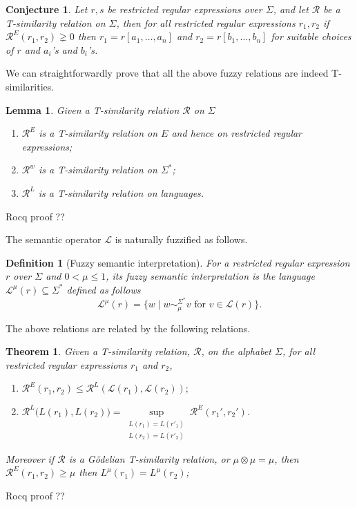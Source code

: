 \documentclass{article}
\newcommand{\cR}{{\mathcal R}}
\def\cut{\mu}
\newtheorem{definition}{Definition}[section]
\newtheorem{lemma}{Lemma}[section]
\newtheorem{theorem}{Theorem}[section]
\newtheorem{conjecture}{Conjecture}[section]
\begin{document}
{\color{red}\begin{conjecture} Let $r,s$ be restricted regular expressions over $\Sigma$, and let $\mathcal{R}$ be a T-similarity relation on $\Sigma$, then for all restricted regular expressions $r_1,r_2$ if $\mathcal{R}^E(r_1,r_2)\gneq 0$ then $r_1=r[a_1,\ldots,a_n] $ and $r_2=r[b_1,\ldots,b_n] $ for suitable choices of $r$ and $a_i$'s and $b_i$'s. 
\end{conjecture}}

We can straightforwardly prove that all the above fuzzy relations are indeed T-similarities.
\begin{lemma} \label{T-similarity}Given a T-similarity relation $\mathcal R$ on $\Sigma$ \begin{enumerate}
\item $\mathcal{R}^{E}$ is a T-similarity relation on $E$ and hence on restricted regular expressions;
\item $\mathcal{R}^w$ is a T-similarity relation on $\Sigma^*$;
\item$\mathcal R^L$ is a T-similarity relation on languages.
\end{enumerate}
\end{lemma}
{\color{red} Rocq proof ??}\vspace{0.5cm}

\noindent The semantic operator $\mathcal L$ is naturally fuzzified as follows.
\begin{definition}[Fuzzy semantic interpretation] For a restricted regular expression $r$ over $\Sigma$ and
$0 < \cut \le 1$, its {\em fuzzy semantic interpretation} is the language $\mathcal L^\mu(r)\subseteq \Sigma^{\ast}$ defined as follows 
\[\mathcal L^\mu (r)=\{w\mid w\sim_\mu^{\Sigma^*}v\mbox{ for } v\in \mathcal L(r)\}.\]
\end{definition}

\noindent The above relations are related by the following relations.
\begin{theorem}\label{thm:Rr-RL-bridge} Given a T-similarity relation, $\cR$, on the alphabet $\Sigma$, for all restricted regular expressions $r_1$ and $r_2$,
\begin{enumerate} 
\item$\mathcal R^E(r_1,r_2)\leq \mathcal R^L(\mathcal L(r_1),\mathcal L(r_2));$

\item$\mathcal{R}^L\bigl(L(r_1),L(r_2)\bigr)=\sup\limits_{\substack{L(r_1)=L(r'_1)\\L(r_2)=L(r'_2)}}\mathcal{R}^E(r_1',r_2')$.

\end{enumerate}
Moreover if $\cR$ is a G\"odelian T-similarity relation, or $\mu\otimes\mu=\mu $, then $\mathcal R^E(r_1,r_2)\geq \mu$ then $L^\mu(r_1)=L^\mu(r_2)$;
\end{theorem}
{\color{red} Rocq proof ??}\vspace{0.5cm}
\end{document}
